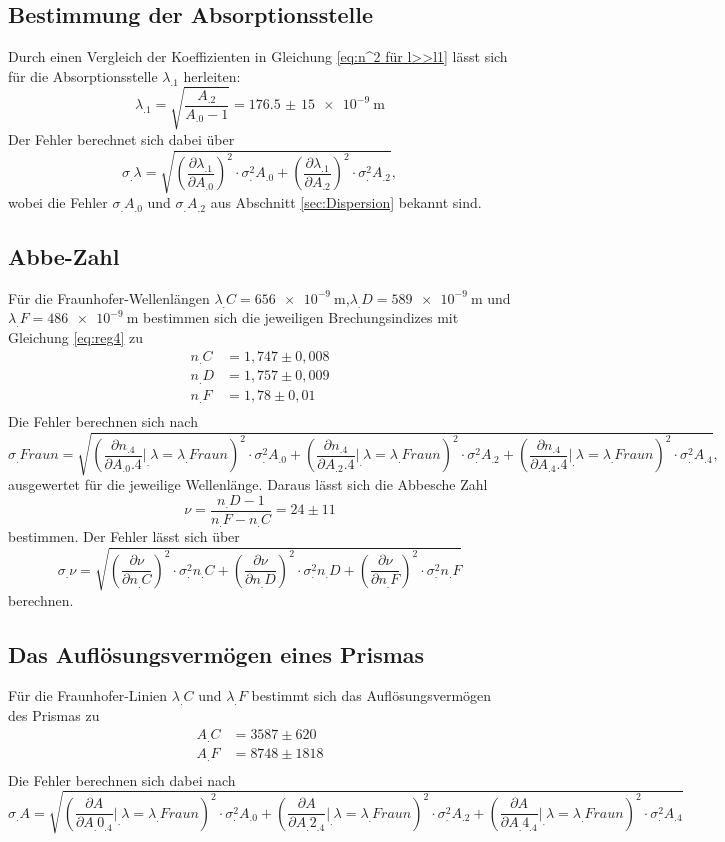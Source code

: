 \subsection{Bestimmung der Absorptionsstelle}

Durch einen Vergleich der Koeffizienten in Gleichung \eqref{eq:n^2 für l>>l1} lässt sich für die Absorptionsstelle $\lambda_.1$ herleiten:
\[
\lambda_.1 = \sqrt{\frac{A_.2}{A_.0-1}}=\SI{176,5(15)e-9}{\metre}
\]
Der Fehler berechnet sich dabei über
\[
\sigma_.{\lambda} =\sqrt{\left(\frac{\partial \lambda_.1}{\partial A_.0}\right)^2\cdot\sigma^2_.{A_.0}+\left(\frac{\partial\lambda_.1}{\partial A_.2}\right)^2\cdot\sigma^2_.{A_.2}},
\]
wobei die Fehler $\sigma_.{A_.0}$ und $\sigma_.{A_.2}$ aus Abschnitt \ref{sec:Dispersion} bekannt sind.

\subsection{Abbe-Zahl}
Für die Fraunhofer-Wellenlängen $\lambda_.C=\SI{656e-9}{\metre}$,$\lambda_.D=\SI{589e-9}{\metre}$ und $\lambda_.F=\SI{486e-9}{\metre}$ bestimmen sich die jeweiligen Brechungsindizes mit Gleichung \eqref{eq:reg4} zu
\begin{align*}
n_.C&=1,747\pm 0,008\\
n_.D&=1,757\pm 0,009\\
n_.F&=1,78\pm 0,01\\
\end{align*}
Die Fehler berechnen sich nach
\[
\sigma_.{Fraun}=\sqrt{\left(\frac{\partial n_.4}{\partial A_.0.4}\bigg|_.{\lambda=\lambda_.Fraun}\right)^2\cdot\sigma^2_.{A_.0}+\left(\frac{\partial n_.4}{\partial A_.2.4}\bigg|_.{\lambda=\lambda_.Fraun}\right)^2\cdot\sigma^2_.{A_.2}+\left(\frac{\partial n_.4}{\partial A_.4.4}\bigg|_.{\lambda=\lambda_.Fraun}\right)^2\cdot\sigma^2_.{A_.4}},
\]
ausgewertet für die jeweilige Wellenlänge.
Daraus lässt sich die Abbesche Zahl 
\[
\nu = \frac{n_.D-1}{n_.F-n_.C}=24 \pm 11
\]
bestimmen.
Der Fehler lässt sich über
\[
\sigma_.{\nu}=\sqrt{\left(\frac{\partial\nu}{\partial n_.C}\right)^2\cdot\sigma^2_.{n_.C} + \left(\frac{\partial\nu}{\partial n_.D}\right)^2\cdot\sigma^2_.{n_.D} + \left(\frac{\partial\nu}{\partial n_.F}\right)^2\cdot\sigma^2_.{n_.F}}
\]
berechnen.
\subsection{Das Auflösungsvermögen eines Prismas}
Für die Fraunhofer-Linien $\lambda_.C$ und $\lambda_.F$ bestimmt sich das Auflösungsvermögen des Prismas zu
\begin{align*}
A_.C&=3587\pm 620\\
A_.F&=8748\pm 1818\\
\end{align*}
Die Fehler berechnen sich dabei nach
\[
\sigma_.A=\sqrt{\left(\frac{\partial A}{\partial A_.{0_.4}}\bigg|_.{\lambda=\lambda_.{Fraun}}\right)^2\cdot\sigma^2_.{A_.0}+\left(\frac{\partial A}{\partial A_.{2_.4}}\bigg|_.{\lambda=\lambda_.{Fraun}}\right)^2\cdot\sigma^2_.{A_.2}+\left(\frac{\partial A}{\partial A_.{4_.4}}\bigg|_.{\lambda=\lambda_.{Fraun}}\right)^2\cdot\sigma^2_.{A_.4}}
\]
